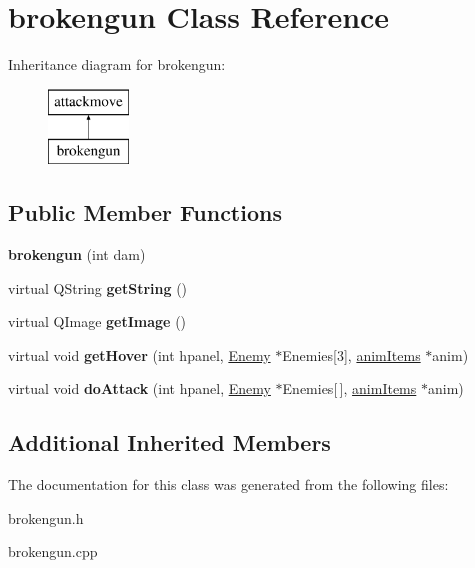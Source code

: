 \hypertarget{classbrokengun}{\section{brokengun Class Reference}
\label{classbrokengun}
}
Inheritance diagram for brokengun\-:\begin{figure}[H]
\begin{center}
\leavevmode
\includegraphics[height=2.000000cm]{classbrokengun}
\end{center}
\end{figure}
\subsection*{Public Member Functions}
\begin{DoxyCompactItemize}
\item 
\hypertarget{classbrokengun_a01e8a685a44e19355ef284c3f172532c}{{\bfseries brokengun} (int dam)}\label{classbrokengun_a01e8a685a44e19355ef284c3f172532c}

\item 
\hypertarget{classbrokengun_af525de1fc249ff4fadec008b367881e9}{virtual Q\-String {\bfseries get\-String} ()}\label{classbrokengun_af525de1fc249ff4fadec008b367881e9}

\item 
\hypertarget{classbrokengun_aceb704b315cbac5e23093637a9b3c0c0}{virtual Q\-Image {\bfseries get\-Image} ()}\label{classbrokengun_aceb704b315cbac5e23093637a9b3c0c0}

\item 
\hypertarget{classbrokengun_ab2250f29c2057006662e77d7f70796d2}{virtual void {\bfseries get\-Hover} (int hpanel, \hyperlink{class_enemy}{Enemy} $\ast$Enemies\mbox{[}3\mbox{]}, \hyperlink{classanim_items}{anim\-Items} $\ast$anim)}\label{classbrokengun_ab2250f29c2057006662e77d7f70796d2}

\item 
\hypertarget{classbrokengun_a36f299faa4df56576af55adbff08a9be}{virtual void {\bfseries do\-Attack} (int hpanel, \hyperlink{class_enemy}{Enemy} $\ast$Enemies\mbox{[}$\,$\mbox{]}, \hyperlink{classanim_items}{anim\-Items} $\ast$anim)}\label{classbrokengun_a36f299faa4df56576af55adbff08a9be}

\end{DoxyCompactItemize}
\subsection*{Additional Inherited Members}


The documentation for this class was generated from the following files\-:\begin{DoxyCompactItemize}
\item 
brokengun.\-h\item 
brokengun.\-cpp\end{DoxyCompactItemize}

